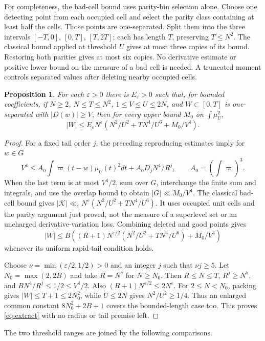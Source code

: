 \documentclass[11pt,a4paper,oneside]{article}
\newtheorem{proposition}[theorem]{Proposition}
\theoremstyle{definition}
\newcommand{\eps}{\varepsilon}
\numberwithin{equation}{section}
\begin{document}
For completeness, the bad-cell bound uses parity-bin selection alone.
Choose one detecting point from each occupied cell and select the parity class
containing at least half the cells. Those points are one-separated.
Split them into the three intervals $[-T,0]$, $[0,T]$, $[T,2T]$;
each has length $T$, preserving $T\le N^2$. The classical bound applied
at threshold $U$ gives at most three copies of its bound. Restoring both
parities gives at most six copies. No derivative estimate or positive
lower bound on the measure of a bad cell is needed.
A truncated moment controls separated values after deleting nearby occupied cells.
\begin{proposition}\label{prop:extraction}
For each $\eps>0$ there is $E_\eps>0$ such that, for bounded coefficients, if
$N\ge2$, $N\le T\le N^2$, $1\le V\le U\le2N$, and
$W\subset[0,T]$ is one-separated with $|D(w)|\ge V$, then for every
upper bound $M_0$ on $\int\mu_U^2$,
\begin{equation}\label{eq:extract}
 |W|\le E_\eps N^\eps
 \left(N^2/U^2+TN^4/U^6+M_0/V^4\right).
\end{equation}
\end{proposition}
\begin{proof}
For a fixed tail order $j$, the preceding reproducing estimates imply for
$w\in G$
\[
 V^4\le A_0\int \varpi(t-w)\mu_U(t)^2dt+A_0D_jN^4/R^j,
 \qquad A_0=\left(\int \varpi\right)^3.
\]
When the last term is at most $V^4/2$, sum over $G$, interchange the finite
sum and integrals, and use the overlap bound to obtain
$|G|\ll M_0/V^4$. The classical bad-cell bound gives
$|\mathcal K|\ll_{\eps}N^\eps(N^2/U^2+TN^4/U^6)$.
It uses occupied unit cells and the parity argument just proved, not the
measure of a superlevel set or an uncharged derivative-variation loss. Combining deleted and good points gives
\[
 |W|\le B\left((R+1)N^{\eps/2}(N^2/U^2+TN^4/U^6)+M_0/V^4\right)
\]
whenever its uniform rapid-tail condition holds.

Choose $\nu=\min(\eps/2,1/2)>0$ and an integer $j$ such that $\nu j\ge5$.
Let $N_0=\max(2,2B)$ and take $R=N^\nu$ for $N\ge N_0$.
Then $R\le N\le T$, $R^j\ge N^5$, and $BN^4/R^j\le1/2\le V^4/2$.
Also $(R+1)N^{\eps/2}\le2N^\eps$.
For $2\le N<N_0$, packing gives $|W|\le T+1\le2N_0^2$, while
$U\le2N$ gives $N^2/U^2\ge1/4$. Thus an enlarged common constant
$8N_0^2+2B+1$ covers the bounded-length case too. This proves
\eqref{eq:extract} with no radius or tail premise left.
\end{proof}
The two threshold ranges are joined by the following comparisons.
\end{document}
